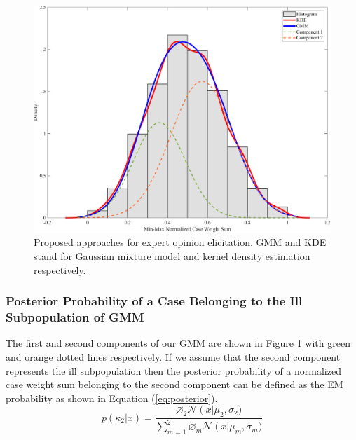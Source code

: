\begin{figure}[htb!]
	\centering
	\includegraphics[width=\textwidth, keepaspectratio]{images/elicitation/approaches.pdf}
	\caption[Proposed approaches for expert opinion elicitation]{Proposed approaches for expert opinion elicitation. GMM and KDE stand for Gaussian mixture model and kernel density estimation respectively.}
	\label{fig:elicitation_approaches}
\end{figure}

\subsubsection{Posterior Probability of a Case Belonging to the Ill Subpopulation of GMM}
\label{sec:posterior-approach}
The first and second components of our GMM are shown in Figure \ref{fig:elicitation_approaches} with green and orange dotted lines respectively. If we assume that the second component represents the ill subpopulation then the posterior probability of a normalized case weight sum belonging to the second component \cite{Reynolds2009} can be defined as the EM probability as shown in Equation (\ref{eq:posterior}).
\begin{equation}
	\label{eq:posterior}
	p\left(\kappa_{2} \vert  x\right) = \frac{\varnothing_{2}\mathcal{N}\left(x\right\vert  \mu_{2},\sigma_{2})}{\sum_{m = 1}^{2}\varnothing_{m}\mathcal{N}\left(x\right\vert  \mu_{m},\sigma_{m})}
\end{equation}

